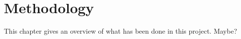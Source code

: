 
\chapter{Methodology}
\label{chap:methodology}

This chapter gives an overview of what has been done in this project.
Maybe?




